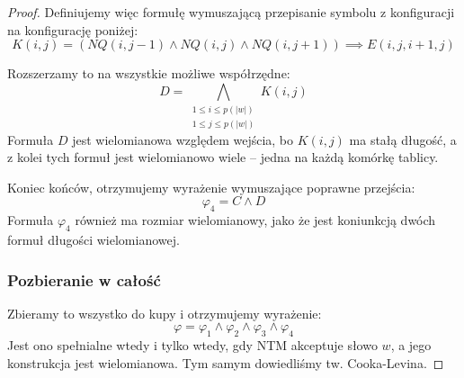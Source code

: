 \begin{proof}
        Definiujemy więc formułę wymuszającą przepisanie symbolu z konfiguracji na konfigurację poniżej: 
        \[ 
            K(i,j) = (NQ(i, j-1) \land NQ(i,j) \land NQ(i, j+1)) \implies E(i, j, i+1, j)
        \]
        
        Rozszerzamy to na wszystkie możliwe współrzędne:
        \[
            D = \bigwedge_{\substack{1 \leq i \leq p(|w|) \\ 1 \leq j \leq p(|w|)}} K(i,j)
        \]
        Formuła \(D\) jest wielomianowa względem wejścia, bo \(K(i,j)\) ma stałą długość, a z kolei tych formuł jest wielomianowo wiele -- jedna na każdą komórkę tablicy.
        
        Koniec końców, otrzymujemy wyrażenie wymuszające poprawne przejścia: 
        \[ 
            \varphi_4 = C \land D
        \]
        Formuła \(\varphi_4\) również ma rozmiar wielomianowy, jako że jest koniunkcją dwóch formuł długości wielomianowej. 
        
        \subsubsection{Pozbieranie w całość}
        Zbieramy to wszystko do kupy i otrzymujemy wyrażenie:
        \[ 
            \varphi = \varphi_1 \land \varphi_2 \land \varphi_3 \land \varphi_4
        \]
        Jest ono spełnialne wtedy i tylko wtedy, gdy NTM akceptuje słowo \(w\), a jego konstrukcja jest wielomianowa. Tym samym dowiedliśmy tw. Cooka-Levina.
\end{proof}